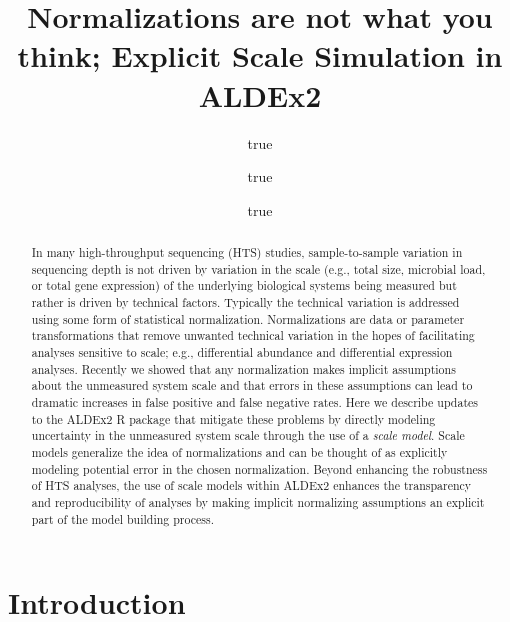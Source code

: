 \documentclass[
]{article}
\title{Normalizations are not what you think; Explicit Scale Simulation
in ALDEx2}
\author{true \and true \and true}
\date{}
\begin{document}
\maketitle
\begin{abstract}
In many high-throughput sequencing (HTS) studies, sample-to-sample
variation in sequencing depth is not driven by variation in the scale
(e.g., total size, microbial load, or total gene expression) of the
underlying biological systems being measured but rather is driven by
technical factors. Typically the technical variation is addressed using
some form of statistical normalization. Normalizations are data or
parameter transformations that remove unwanted technical variation in
the hopes of facilitating analyses sensitive to scale; e.g.,
differential abundance and differential expression analyses. Recently we
showed that any normalization makes implicit assumptions about the
unmeasured system scale and that errors in these assumptions can lead to
dramatic increases in false positive and false negative rates. Here we
describe updates to the ALDEx2 R package that mitigate these problems by
directly modeling uncertainty in the unmeasured system scale through the
use of a \textit{scale model}. Scale models generalize the idea of
normalizations and can be thought of as explicitly modeling potential
error in the chosen normalization. Beyond enhancing the robustness of
HTS analyses, the use of scale models within ALDEx2 enhances the
transparency and reproducibility of analyses by making implicit
normalizing assumptions an explicit part of the model building process.
\end{abstract}

\hypertarget{introduction}{%
\section{Introduction}\label{introduction}}
\end{document}
